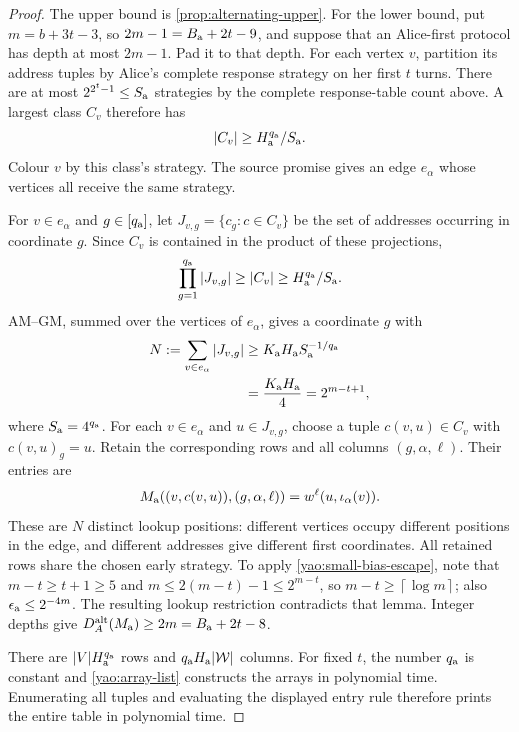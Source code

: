 \documentclass[11pt]{article} \usepackage[utf8]{inputenc}
\theoremstyle{plain} \newtheorem{theorem}{Theorem}[section]
\theoremstyle{definition} \newaliascnt{definition}{theorem}
\newcommand{\ceil}[1]{\left\lceil#1\right\rceil}
\begin{document}
\begin{proof}
The upper bound is \cref{prop:alternating-upper}. For the lower bound, put
$m=b+3t-3$, so $2m-1=B_{\rm a}+2t-9$, and suppose that an Alice-first protocol
has depth at most $2m-1$. Pad it to that depth. For each vertex $v$, partition
its address tuples by Alice's complete response strategy on her first $t$ turns.
There are at most $2^{2^t-1}\le S_{\rm a}$ strategies by the complete response-table
count above. A largest class $C_v$ therefore has
\[
|C_v|\ge H_{\rm a}^{q_{\rm a}}/S_{\rm a}.
\]
Colour $v$ by this class's strategy. The source promise gives an edge
$e_\alpha$ whose vertices all receive the same strategy.

For $v\in e_\alpha$ and $g\in[q_{\rm a}]$, let
$J_{v,g}=\{c_g:c\in C_v\}$ be the set of addresses occurring in coordinate
$g$. Since $C_v$ is contained in the product of these projections,
\[
\prod_{g=1}^{q_{\rm a}}|J_{v,g}|\ge |C_v|
\ge H_{\rm a}^{q_{\rm a}}/S_{\rm a}.
\]
AM--GM, summed over the vertices of $e_\alpha$, gives a coordinate $g$ with
\[
\begin{aligned}
N:=\sum_{v\in e_\alpha}|J_{v,g}|
&\ge K_{\rm a}H_{\rm a}S_{\rm a}^{-1/q_{\rm a}}\\
&=\frac{K_{\rm a}H_{\rm a}}4=2^{m-t+1},
\end{aligned}
\]
where $S_{\rm a}=4^{q_{\rm a}}$.
For each $v\in e_\alpha$ and $u\in J_{v,g}$, choose a tuple $c(v,u)\in C_v$
with $c(v,u)_g=u$. Retain the corresponding rows and all columns
$(g,\alpha,\ell)$. Their entries are
\[
M_{\rm a}((v,c(v,u)),(g,\alpha,\ell))
=w^\ell(u,\iota_\alpha(v)).
\]
These are $N$ distinct lookup positions: different vertices occupy different
positions in the edge, and different addresses give different first coordinates.
All retained rows share the chosen early strategy. To apply
\cref{yao:small-bias-escape}, note that $m-t\ge t+1\ge5$ and
$m\le2(m-t)-1\le2^{m-t}$, so $m-t\ge\ceil{\log m}$; also
$\epsilon_{\rm a}\le2^{-4m}$. The resulting lookup restriction contradicts
that lemma. Integer depths give
$D_A^{\rm alt}(M_{\rm a})\ge2m=B_{\rm a}+2t-8$.

There are $|V|H_{\rm a}^{q_{\rm a}}$ rows and
$q_{\rm a}H_{\rm a}|\mathcal W|$ columns. For fixed $t$, the number
$q_{\rm a}$ is constant and \cref{yao:array-list} constructs the arrays in
polynomial time. Enumerating all tuples and evaluating the displayed entry rule
therefore prints the entire table in polynomial time.
\end{proof}
\end{document}
